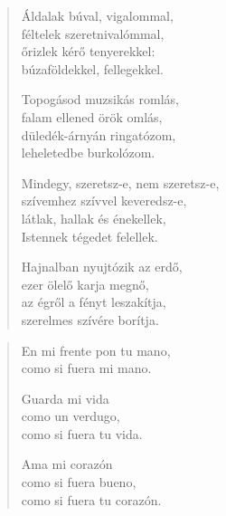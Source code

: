 \documentclass[11pt]{extbook}
\newcommand*{\centeredornament}{\centerline{\pgfornament[width=6cm]{88}}}
\begin{document}
\newpage

\vspace*{-15mm}
\centeredornament



\begin{verse}
  Áldalak búval, vigalommal, \\
  féltelek szeretnivalómmal, \\
  őrizlek kérő tenyerekkel: \\
  búzaföldekkel, fellegekkel.

  Topogásod muzsikás romlás, \\
  falam ellened örök omlás, \\
  düledék-árnyán ringatózom, \\
  leheletedbe burkolózom.

  Mindegy, szeretsz-e, nem szeretsz-e, \\
  szívemhez szívvel keveredsz-e, \\
  látlak, hallak és énekellek, \\
  Istennek tégedet felellek.

  Hajnalban nyujtózik az erdő, \\
  ezer ölelő karja megnő, \\
  az égről a fényt leszakítja, \\
  szerelmes szívére borítja.
\end{verse}

\newpage

\vspace*{-15mm}
\centeredornament



\begin{verse}
  En mi frente pon tu mano, \\
  como si fuera mi mano.

  Guarda mi vida \\
  como un verdugo, \\
  como si fuera tu vida.

  Ama mi corazón \\
  como si fuera bueno, \\
  como si fuera tu corazón.
\end{verse}

\newpage

\vspace*{-15mm}
\centeredornament
\end{document}
